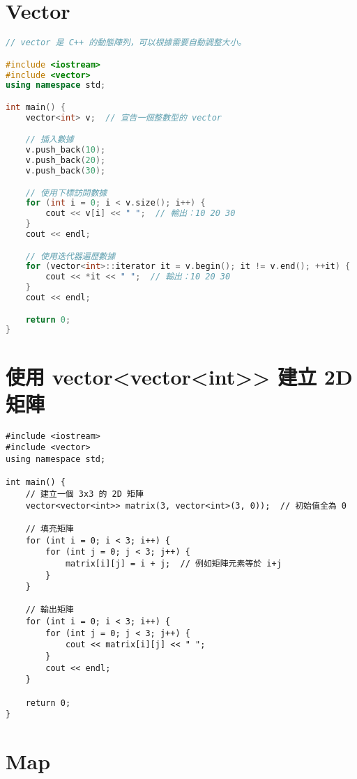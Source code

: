 \documentclass{article}
\begin{document}
\begin{multicols}{2}

\section{Vector}

\begin{lstlisting}[language=C++]
// vector 是 C++ 的動態陣列，可以根據需要自動調整大小。

#include <iostream>
#include <vector>
using namespace std;

int main() {
    vector<int> v;  // 宣告一個整數型的 vector

    // 插入數據
    v.push_back(10);
    v.push_back(20);
    v.push_back(30);

    // 使用下標訪問數據
    for (int i = 0; i < v.size(); i++) {
        cout << v[i] << " ";  // 輸出：10 20 30
    }
    cout << endl;

    // 使用迭代器遍歷數據
    for (vector<int>::iterator it = v.begin(); it != v.end(); ++it) {
        cout << *it << " ";  // 輸出：10 20 30
    }
    cout << endl;

    return 0;
}
\end{lstlisting}

\section{使用 vector<vector<int>> 建立 2D 矩陣}

\begin{lstlisting}
#include <iostream>
#include <vector>
using namespace std;

int main() {
    // 建立一個 3x3 的 2D 矩陣
    vector<vector<int>> matrix(3, vector<int>(3, 0));  // 初始值全為 0

    // 填充矩陣
    for (int i = 0; i < 3; i++) {
        for (int j = 0; j < 3; j++) {
            matrix[i][j] = i + j;  // 例如矩陣元素等於 i+j
        }
    }

    // 輸出矩陣
    for (int i = 0; i < 3; i++) {
        for (int j = 0; j < 3; j++) {
            cout << matrix[i][j] << " ";
        }
        cout << endl;
    }

    return 0;
}
\end{lstlisting}

\section{Map}


\end{multicols}
\end{document}
